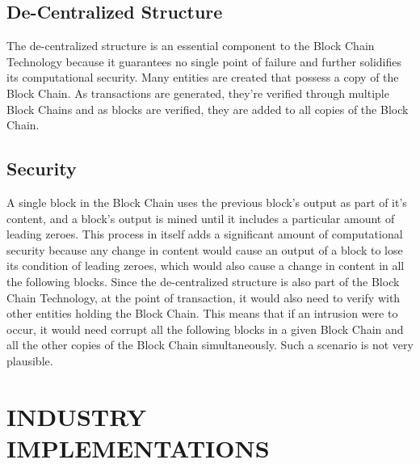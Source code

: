 \documentclass{article} %
\begin{document}
\noindent 
\subsection{De-Centralized Structure}

\begin{flushleft}
The de-centralized structure is an essential component to the Block Chain Technology because it guarantees no single point of failure and further solidifies its computational security. Many entities are created that possess a copy of the Block Chain. As transactions are generated, they're verified through multiple Block Chains and as blocks are verified, they are added to all copies of the Block Chain. 
\end{flushleft}

\noindent 
\subsection{Security}

\begin{flushleft}
A single block in the Block Chain uses the previous block's output as part of it's content, and a block's output is mined until it includes a particular amount of leading zeroes. This process in itself adds a significant amount of computational security because any change in content would cause an output of a block to lose its condition of leading zeroes, which would also cause a change in content in all the following blocks. Since the de-centralized structure is also part of the Block Chain Technology, at the point of transaction, it would also need to verify with other entities holding the Block Chain. This means that if an intrusion were to occur, it would need corrupt all the following blocks in a given Block Chain and all the other copies of the Block Chain simultaneously. Such a scenario is not very plausible.

\noindent 
\end{flushleft}

\noindent 
\section{INDUSTRY IMPLEMENTATIONS}
\end{document}
